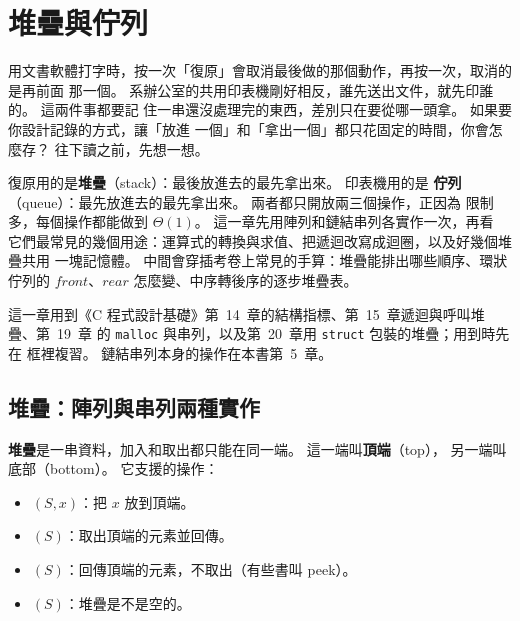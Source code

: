 \chapter{堆疊與佇列}
\label{ch:stackqueue}

\newcommand{\sqpow}{\text{\textasciicircum}}

用文書軟體打字時，按一次「復原」會取消最後做的那個動作，再按一次，取消的是再前面
那一個。 系辦公室的共用印表機剛好相反，誰先送出文件，就先印誰的。 這兩件事都要記
住一串還沒處理完的東西，差別只在要從哪一頭拿。 如果要你設計記錄的方式，讓「放進
一個」和「拿出一個」都只花固定的時間，你會怎麼存？ 往下讀之前，先想一想。

復原用的是\textbf{堆疊}（stack）：最後放進去的最先拿出來。 印表機用的是
\textbf{佇列}（queue）：最先放進去的最先拿出來。 兩者都只開放兩三個操作，正因為
限制多，每個操作都能做到 $\Theta(1)$。 這一章先用陣列和鏈結串列各實作一次，再看
它們最常見的幾個用途：運算式的轉換與求值、把遞迴改寫成迴圈，以及好幾個堆疊共用
一塊記憶體。 中間會穿插考卷上常見的手算：堆疊能排出哪些順序、環狀佇列的
$\mathit{front}$、$\mathit{rear}$ 怎麼變、中序轉後序的逐步堆疊表。

這一章用到《C 程式設計基礎》第~14~章的結構指標、第~15~章遞迴與呼叫堆疊、第~19~章
的 \texttt{malloc} 與串列，以及第~20~章用 \texttt{struct} 包裝的堆疊；用到時先在
框裡複習。 鏈結串列本身的操作在本書第~5~章。

\section{堆疊：陣列與串列兩種實作}
\label{sec:sq-stack}

\textbf{堆疊}是一串資料，加入和取出都只能在同一端。 這一端叫\textbf{頂端}（top），
另一端叫底部（bottom）。 它支援的操作：

\begin{itemize}
\item {}$(S, x)$：把 $x$ 放到頂端。
\item {}$(S)$：取出頂端的元素並回傳。
\item {}$(S)$：回傳頂端的元素，不取出（有些書叫 peek）。
\item {}$(S)$：堆疊是不是空的。
\end{itemize}

